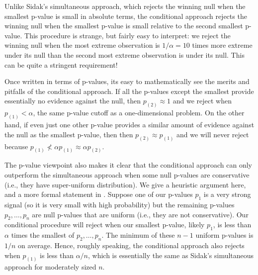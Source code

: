 \documentclass{article}
\begin{document}
Unlike Sidak's simultaneous approach, which rejects the winning null when the smallest p-value is small in absolute terms, the conditional approach rejects the winning null when the smallest p-value is small relative to the second smallest p-value. This procedure is strange, but fairly easy to interpret: we reject the winning null when the most extreme observation is $1/\alpha = 10$ times more extreme under its null than the second most extreme observation is under its null. This can be quite a stringent requirement! 

Once written in terms of p-values, its easy to mathematically see the merits and pitfalls of the conditional approach. If all the p-values except the smallest provide essentially no evidence against the null,  then $p_{(2)} \approx 1$ and we reject when $p_{(1)} < \alpha$, the same p-value cutoff as a one-dimensional problem. On the other hand, if even just one other p-value provides a similar amount of evidence against the null as the smallest p-value, then then $p_{(2)} \approx p_{(1)}$ and we will never reject because $p_{(1)} \not < \alpha p_{(1)} \approx \alpha p_{(2)}$.

The p-value viewpoint also makes it clear that the conditional approach can only outperform the simultaneous approach when some null p-values are conservative (i.e., they have super-uniform distribution). We give a heuristic argument here, and a more formal statement in . Suppose one of our p-values $p_1$ is a very strong signal (so it is very small with high probability) but the remaining p-values $p_2, \dots, p_n$ are null p-values that are uniform (i.e., they are not conservative). Our conditional procedure will reject when our smallest p-value, likely $p_1$, is less than $\alpha$ times the smallest of $p_2, \dots, p_n$. The minimum of these $n-1$ uniform p-values is $1/n$ on average. Hence, roughly speaking, the conditional approach also rejects when $p_{(1)}$ is less than $\alpha/n$, which is essentially the same as Sidak's simultaneous approach for moderately sized $n$.  

\end{document}
